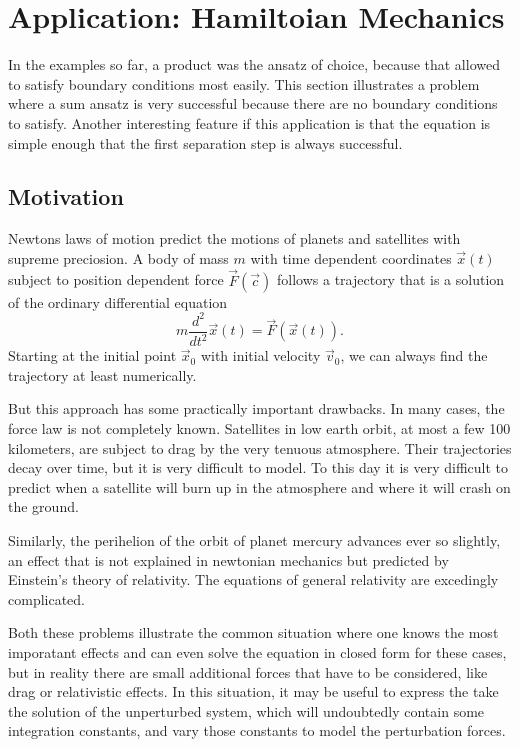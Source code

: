 %
%
%
\section{Application: Hamiltoian Mechanics\label{hamilton-mechanik}}
In the examples so far, a product was the ansatz of choice, because
that allowed to satisfy boundary conditions most easily.
This section illustrates a problem where a sum ansatz is very successful
because there are no boundary conditions to satisfy.
Another interesting feature if this application is that the
equation is simple enough that the first separation step is 
always successful.

\subsection{Motivation}
Newtons laws of motion predict the motions of planets and satellites
with supreme preciosion.
A body of mass $m$ with time dependent coordinates $\vec{x}(t)$
subject to position dependent force $\vec{F}(\vec{c})$ follows a
trajectory that is a solution of the ordinary differential equation
\begin{equation}
m\frac{d^2}{dt^2}\vec x(t)=\vec F(\vec x(t)).
\label{jacobi:newton}
\end{equation}
Starting at the initial point $\vec{x}_0$ with initial velocity
$\vec{v}_0$, we can always find the trajectory at least numerically.

But this approach has some practically important drawbacks.
In many cases, the force law is not completely known.
Satellites in low earth orbit, at most a few 100 kilometers, are subject
to drag by the very tenuous atmosphere.
Their trajectories decay over time, but it is very difficult to model.
To this day it is very difficult to predict when a satellite will burn
up in the atmosphere and where it will crash on the ground.

Similarly, the perihelion of the orbit of planet mercury advances
ever so slightly, an effect that is not explained in newtonian mechanics
but predicted by Einstein's theory of relativity.
The equations of general relativity are excedingly complicated.

Both these problems illustrate the common situation where one knows
the most imporatant effects and can even solve the equation in closed
form for these cases, but in reality there are small additional
forces that have to be considered, like drag or relativistic effects.
In this situation, it may be useful to express the take the solution
of the unperturbed system, which will undoubtedly contain some integration
constants, and vary those constants to model the perturbation forces.

